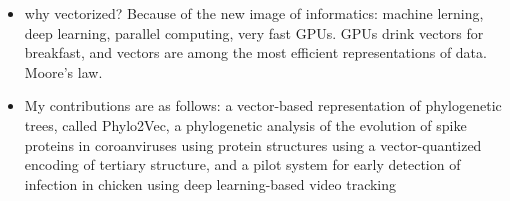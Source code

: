 \begin{itemize}
\item why vectorized? Because of the new image of informatics: machine lerning, deep learning, parallel computing, very fast GPUs. GPUs drink vectors for breakfast, and vectors are among the most efficient representations of data. Moore's law. 
\item My contributions are as follows: a vector-based representation of phylogenetic trees, called Phylo2Vec, a phylogenetic analysis of the evolution of spike proteins in coroanviruses using protein structures using a vector-quantized encoding of tertiary structure, and a pilot system for early detection of infection in chicken using deep learning-based video tracking
\end{itemize}